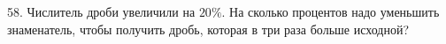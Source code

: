 58. Числитель дроби увеличили на $20\%.$ На сколько процентов надо уменьшить знаменатель, чтобы получить дробь, которая в три раза больше исходной?\\
